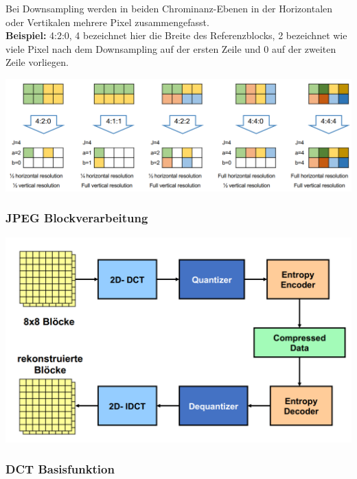 Bei Downsampling werden in beiden Chrominanz-Ebenen in der Horizontalen oder Vertikalen mehrere Pixel zusammengefasst. \\
\textbf{Beispiel: } 4:2:0, 4 bezeichnet hier die Breite des Referenzblocks, 2 bezeichnet wie viele Pixel nach dem Downsampling auf der ersten Zeile und 0 auf der zweiten Zeile vorliegen.
\begin{center}
    \includegraphics[width=1\linewidth]{images/downsampling.png}
\end{center}

\subsubsection{JPEG Blockverarbeitung}

\begin{center}
    \includegraphics[width=1\linewidth]{images/blockverarbeitung.png}
\end{center}

\subsubsection{DCT Basisfunktion}

